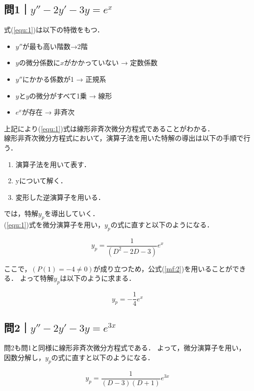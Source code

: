 \documentclass[a4paper,11pt]{bxjsarticle}
\begin{document}
\subsection{問1｜$y''-2y'-3y=e^x$}
式(\ref{equ:1})は以下の特徴をもつ．

\begin{itemize}
  \item $y''$が最も高い階数→2階
  \item $y$の微分係数に$x$がかかっていない → 定数係数
  \item $y''$にかかる係数が1 → 正規系
  \item $y$と$y$の微分がすべて1乗 → 線形
  \item $e^x$が存在 → 非斉次
\end{itemize}

上記により(\ref{equ:1})式は線形非斉次微分方程式であることがわかる．\\

線形非斉次微分方程式において，演算子法を用いた特解の導出は以下の手順で行う．

\begin{enumerate}
  \item 演算子法を用いて表す．
  \item yについて解く．
  \item 変形した逆演算子を用いる．
\end{enumerate}

では，特解$y_p$を導出していく．\\
(\ref{equ:1})式を微分演算子を用い，$y_p$の式に直すと以下のようになる．

\begin{equation}
  y_p = \frac{1}{(D^2-2D-3)}e^x
\end{equation}

ここで，$(P(1)=-4\neq 0)$が成り立つため，公式(\ref{mf:2})を用いることができる．
よって特解$y_p$は以下のように求まる．

\begin{equation}
  y_p = -\frac{1}{4}e^{x}
\end{equation}

\subsection{問2｜$y''-2y'-3y=e^{3x}$}
問2も問1と同様に線形非斉次微分方程式である．
よって，微分演算子を用い，因数分解し，$y_p$の式に直すと以下のようになる．

\begin{equation}
  y_p = \frac{1}{(D-3)(D+1)}e^{3x}
\end{equation}
\end{document}
